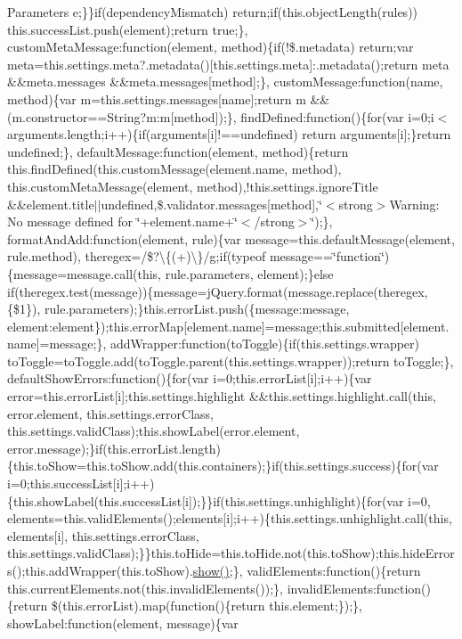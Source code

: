 \begin{DoxyParams}{Parameters}
e;\}\}if(dependency\+Mismatch) return;if(this.\+object\+Length(rules)) this.\+success\+List.\+push(element);return true;\}, custom\+Meta\+Message\+:function(element, method)\{if(!\$.metadata) return;var meta=this.\+settings.\+meta?.metadata()\mbox{[}this.\+settings.\+meta\mbox{]}\+:.metadata();return meta \&\&meta.\+messages \&\&meta.\+messages\mbox{[}method\mbox{]};\}, custom\+Message\+:function(name, method)\{var m=this.\+settings.\+messages\mbox{[}name\mbox{]};return m \&\&(m.\+constructor==String?m\+:m\mbox{[}method\mbox{]});\}, find\+Defined\+:function()\{for(var i=0;i$<$ arguments.\+length;i++)\{if(arguments\mbox{[}i\mbox{]}!==undefined) return arguments\mbox{[}i\mbox{]};\}return undefined;\}, default\+Message\+:function(element, method)\{return this.\+find\+Defined(this.\+custom\+Message(element.\+name, method), this.\+custom\+Meta\+Message(element, method),!this.settings.\+ignore\+Title \&\&element.\+title$\vert$$\vert$undefined,\$.validator.\+messages\mbox{[}method\mbox{]},\char`\"{}$<$strong$>$\+Warning\+: No message defined for \char`\"{}+element.name+\char`\"{}$<$/strong$>$\char`\"{});\}, format\+And\+Add\+:function(element, rule)\{var message=this.\+default\+Message(element, rule.\+method), theregex=/\$?\textbackslash{}\{(+)\textbackslash{}\}/g;if(typeof message==\char`\"{}function\char`\"{})\{message=message.\+call(this, rule.\+parameters, element);\}else if(theregex.\+test(message))\{message=j\+Query.\+format(message.\+replace(theregex, \textquotesingle{}\{\$1\}\textquotesingle{}), rule.\+parameters);\}this.\+error\+List.\+push(\{message\+:message, element\+:element\});this.\+error\+Map\mbox{[}element.\+name\mbox{]}=message;this.\+submitted\mbox{[}element.\+name\mbox{]}=message;\}, add\+Wrapper\+:function(to\+Toggle)\{if(this.\+settings.\+wrapper) to\+Toggle=to\+Toggle.\+add(to\+Toggle.\+parent(this.\+settings.\+wrapper));return to\+Toggle;\}, default\+Show\+Errors\+:function()\{for(var i=0;this.\+error\+List\mbox{[}i\mbox{]};i++)\{var error=this.\+error\+List\mbox{[}i\mbox{]};this.\+settings.\+highlight \&\&this.\+settings.\+highlight.\+call(this, error.\+element, this.\+settings.\+error\+Class, this.\+settings.\+valid\+Class);this.\+show\+Label(error.\+element, error.\+message);\}if(this.\+error\+List.\+length)\{this.\+to\+Show=this.\+to\+Show.\+add(this.\+containers);\}if(this.\+settings.\+success)\{for(var i=0;this.\+success\+List\mbox{[}i\mbox{]};i++)\{this.\+show\+Label(this.\+success\+List\mbox{[}i\mbox{]});\}\}if(this.\+settings.\+unhighlight)\{for(var i=0, elements=this.\+valid\+Elements();elements\mbox{[}i\mbox{]};i++)\{this.\+settings.\+unhighlight.\+call(this, elements\mbox{[}i\mbox{]}, this.\+settings.\+error\+Class, this.\+settings.\+valid\+Class);\}\}this.\+to\+Hide=this.\+to\+Hide.\+not(this.\+to\+Show);this.\+hide\+Errors();this.\+add\+Wrapper(this.\+to\+Show).\hyperlink{jquery-1_810_82-vsdoc_8js_a8dcdb81268297f0ecf76be5e6aebd05c}{show()};\}, valid\+Elements\+:function()\{return this.\+current\+Elements.\+not(this.\+invalid\+Elements());\}, invalid\+Elements\+:function()\{return \$(this.\+error\+List).map(function()\{return this.\+element;\});\}, show\+Label\+:function(element, message)\{var 
\end{DoxyParams}
